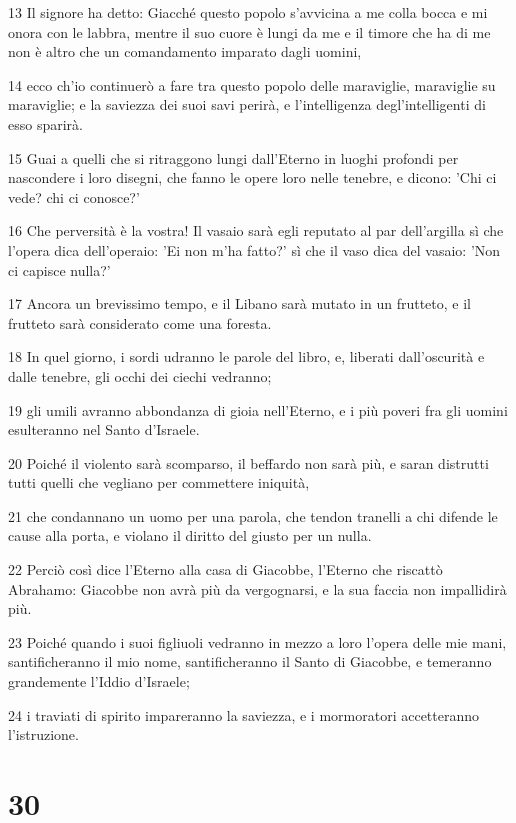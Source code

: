 \par 13 Il signore ha detto: Giacché questo popolo s'avvicina a me colla bocca e mi onora con le labbra, mentre il suo cuore è lungi da me e il timore che ha di me non è altro che un comandamento imparato dagli uomini,
\par 14 ecco ch'io continuerò a fare tra questo popolo delle maraviglie, maraviglie su maraviglie; e la saviezza dei suoi savi perirà, e l'intelligenza degl'intelligenti di esso sparirà.
\par 15 Guai a quelli che si ritraggono lungi dall'Eterno in luoghi profondi per nascondere i loro disegni, che fanno le opere loro nelle tenebre, e dicono: 'Chi ci vede? chi ci conosce?'
\par 16 Che perversità è la vostra! Il vasaio sarà egli reputato al par dell'argilla sì che l'opera dica dell'operaio: 'Ei non m'ha fatto?' sì che il vaso dica del vasaio: 'Non ci capisce nulla?'
\par 17 Ancora un brevissimo tempo, e il Libano sarà mutato in un frutteto, e il frutteto sarà considerato come una foresta.
\par 18 In quel giorno, i sordi udranno le parole del libro, e, liberati dall'oscurità e dalle tenebre, gli occhi dei ciechi vedranno;
\par 19 gli umili avranno abbondanza di gioia nell'Eterno, e i più poveri fra gli uomini esulteranno nel Santo d'Israele.
\par 20 Poiché il violento sarà scomparso, il beffardo non sarà più, e saran distrutti tutti quelli che vegliano per commettere iniquità,
\par 21 che condannano un uomo per una parola, che tendon tranelli a chi difende le cause alla porta, e violano il diritto del giusto per un nulla.
\par 22 Perciò così dice l'Eterno alla casa di Giacobbe, l'Eterno che riscattò Abrahamo: Giacobbe non avrà più da vergognarsi, e la sua faccia non impallidirà più.
\par 23 Poiché quando i suoi figliuoli vedranno in mezzo a loro l'opera delle mie mani, santificheranno il mio nome, santificheranno il Santo di Giacobbe, e temeranno grandemente l'Iddio d'Israele;
\par 24 i traviati di spirito impareranno la saviezza, e i mormoratori accetteranno l'istruzione.

\chapter{30}

